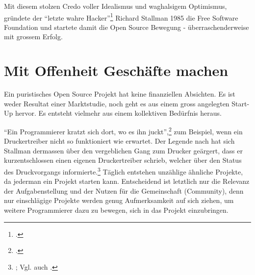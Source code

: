 \documentclass[
paper=164mm:234mm, %
pagesize, %
DIV=calc, %
10pt, %
BCOR=0mm, %
parskip=half- %
]{scrbook}
\begin{document}
Mit diesem stolzen Credo voller Idealismus und waghalsigem Optimismus, gründete der \enquote{letzte wahre Hacker}\footnote{\cite[419]{Levy:1984}.} Richard Stallman 1985 die Free Software Foundation und startete damit die Open Source Bewegung - überraschenderweise mit grossem Erfolg.


{}
\section*{Mit Offenheit Geschäfte machen}

Ein puristisches Open Source Projekt hat keine finanziellen Absichten. Es ist weder Resultat einer Marktstudie, noch geht es aus einem gross angelegten Start-Up hervor. Es entsteht vielmehr aus einem kollektiven Bedürfnis heraus.

\enquote{Ein Programmierer kratzt sich dort, wo es ihn juckt},\footnote{\cite[4]{Raymond:2001}.} zum Beispiel, wenn ein Druckertreiber nicht so funktioniert wie erwartet. Der Legende nach hat sich Stallman dermassen über den vergeblichen Gang zum Drucker geärgert, dass er kurzentschlossen einen eigenen Druckertreiber schrieb, welcher über den Status des Druckvorgangs informierte.\footnote{\cite[32]{Raymond:1999}; Vgl. auch \cite[9]{Stallman:2010}.} Täglich entstehen unzählige ähnliche Projekte, da jederman ein Projekt starten kann. Entscheidend ist letztlich nur die Relevanz der Aufgabenstellung und der Nutzen für die Gemeinschaft (Community), denn nur einschlägige Projekte werden genug Aufmerksamkeit auf sich ziehen, um weitere Programmierer dazu zu bewegen, sich in das Projekt einzubringen.
\end{document}
